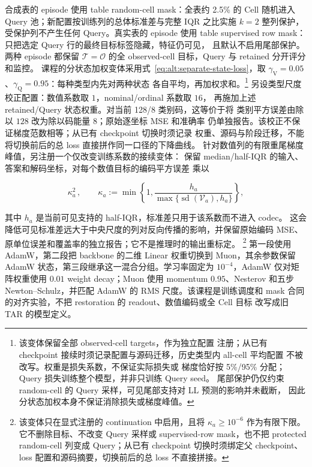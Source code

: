 \documentclass[11pt,UTF8,fontset=fandol]{ctexart}
\numberwithin{equation}{section}
\theoremstyle{definition}
\newcommand{\Oset}{\mathcal O}
\newcommand{\Vset}{\mathcal V}
\newcommand{\TargetSet}{\mathcal T}
\begin{document}
合成表的 episode 使用 table random-cell mask：全表约 2.5\% 的 Cell 随机进入
Query 池；新配置按训练列的总体标准差与完整 IQR 之比实施 $k=2$ 整列保护，
受保护列不产生任何 Query。真实表的 episode 使用
table supervised row mask：只把选定 Query 行的最终目标标签隐藏，特征仍可见，
且默认不启用尾部保护。两种 episode 都保留
$\TargetSet=\Oset$ 的全 observed-cell 目标，Query 与 retained 分开评分和监控。
课程的分状态加权变体采用式~\eqref{eq:alt:separate-state-loss}，取
$\gamma_{\mathrm V}=0.05$、$\gamma_{\mathrm Q}=0.95$：每种类型内先对两种状态
各自平均，再加权求和。\footnote{该变体保留全部 observed-cell targets，作为独立配置
注册；从已有 checkpoint 接续时须记录配置与源码迁移，历史类型内 all-cell 平均配置
不被改写。权重是损失系数，不保证实际损失或
梯度恰好按 5\%/95\% 分配；Query 损失训练整个模型，并非只训练 Query seed。
尾部保护仍仅约束 random-cell 的 Query 采样，可见尾部支持对 LL 预测的影响并未截断，
因此分状态加权本身不保证消除损失或梯度峰值。}
另设类型尺度校正配置：数值系数取 $1$，nominal/ordinal 系数取 $16$，
再施加上述 retained/Query 状态权重。对当前 128/8 类别码，这等价于将
类别平方误差由除以 $128$ 改为除以码能量 $8$；原始逐坐标 MSE 和准确率
仍单独报告。该校正不保证梯度范数相等；从已有 checkpoint 切换时须记录
权重、源码与阶段迁移，不能将切换前后的总 loss 直接拼作同一口径的下降曲线。
针对数值列的有限重尾梯度峰值，另注册一个仅改变训练系数的接续变体：
保留 median/half-IQR 的输入、答案和解码坐标，对每个数值目标的编码平方误差
乘以

\begin{equation}
  \kappa_a^2\, ,\qquad
  \kappa_a:=\min\!\left\{1,\frac{h_a}{\max\{\operatorname{sd}(\Vset_a),h_a\}}\right\},
  \label{eq:T:visible-std-loss-scale}
\end{equation}

其中 $h_a$ 是当前可见支持的 half-IQR，标准差只用于该系数而不进入 codec。
这会降低可见标准差远大于中央尺度的列对反向传播的影响，并保留原始编码 MSE、
原单位误差和覆盖率的独立报告；它不是推理时的输出重标定。
\footnote{该变体只在显式注册的 continuation 中启用，且将
$\kappa_a\ge10^{-6}$ 作为有限下限。它不删除目标、不改变 Query 采样或
supervised-row mask，也不把 protected random-cell 列变成 Query；从已有 checkpoint
切换时须绑定父 checkpoint、loss 配置和源码摘要，切换前后的总 loss 不直接拼接。}
第一段使用 AdamW，第二段把 backbone 的二维 Linear 权重切换到
Muon，其余参数保留 AdamW 状态，第三段继承这一混合分组。学习率固定为
$10^{-4}$，AdamW 仅对矩阵权重使用 $0.01$ weight decay；Muon 使用
momentum $0.95$、Nesterov 和五步 Newton--Schulz，并匹配 AdamW 的 RMS
尺度。该课程是训练调度和
mask 合同的对齐实验，不把 restoration 的 readout、数值编码或全 Cell 目标
改写成旧 TAR 的模型定义。
\end{document}
